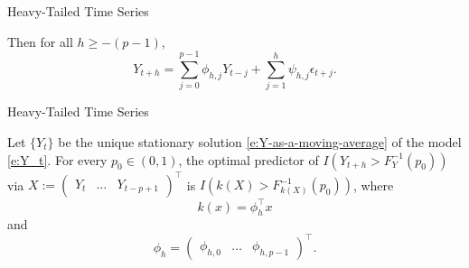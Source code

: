 \documentclass{beamer}
\def\sign{{\rm sign}}
\begin{document}
\begin{frame}{Heavy-Tailed Time Series}
    \begin{lemma}
        Then for all $h \ge -(p - 1)$,
        \begin{equation}\label{eq:y_t_plus_h_expr}
        Y_{t + h} = \sum_{j = 0}^{p - 1} \phi_{h, j}Y_{t - j} + \sum_{j = 1}^h \psi_{h, j}\epsilon_{t + j}. 
        \end{equation}
    \end{lemma}
\end{frame}

\begin{frame}{Heavy-Tailed Time Series}
    \begin{theorem}\label{thm:AR(p)-optimal-predictors}
    Let $\{Y_t\}$ be the unique stationary solution \eqref{e:Y-as-a-moving-average} of the model \eqref{e:Y_t}. For every $p_0 \in (0,1)$, the optimal predictor of $I(Y_{t+h}> F_Y^{-1}(p_0))$
    via $X:=(\begin{matrix}Y_t & \ldots & Y_{t - p + 1}\end{matrix})^{\top}$ is $I(k(X) > F_{k(X)}^{-1}(p_0))$, where 
    \[
    k(x) = \phi_h^{\top}x
    \]
    and
    \[
    \phi_h = (\begin{matrix}\phi_{h, 0} & \ldots & \phi_{h, p - 1}\end{matrix})^{\top}.
    \]
    \end{theorem}
\end{frame}

\end{document}
